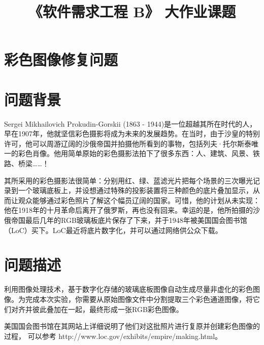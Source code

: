 \documentclass[withoutpreface,bwprint]{cumcmthesis} %
\title{《软件需求工程 B》 大作业课题}
\begin{document}

\newpage
 
%  

\newpage

\section*{\LARGE 彩色图像修复问题}


\section{问题背景}
Sergei Mikhailovich Prokudin-Gorskii (1863 - 1944)是一位超越其所在时代的人，早在1907年，他就坚信彩色摄影将成为未来的发展趋势。在当时，由于沙皇的特别许可，他可以周游辽阔的沙俄帝国并拍摄他所看到的事物，包括列夫·托尔斯泰唯一的彩色肖像。他用简单原始的彩色摄影法拍下了很多东西：人、建筑、风景、铁路、桥梁……！

其所采用的彩色摄影法很简单：分别用红、绿、蓝滤光片把每个场景的三次曝光记录到一个玻璃底板上，并设想通过特殊的投影装置将三种颜色的底片叠加显示，从而让观众能够通过彩色照片了解这个幅员辽阔的国家。可惜，他的计划从未实现：他在1918年的十月革命后离开了俄罗斯，再也没有回来。幸运的是，他所拍摄的沙俄帝国最后几年的RGB玻璃板底片保存了下来，并于1948年被美国国会图书馆（LoC）买下。LoC最近将底片数字化，并可以通过网络供公众下载。

\section{问题描述}
利用图像处理技术，基于数字化存储的玻璃底板图像自动生成尽量非虚化的彩色图像。为完成本次实验，你需要从原始图像文件中分割提取三个彩色通道图像，将它们对齐并彼此叠加在一起，最终形成一张RGB彩色图像。

美国国会图书馆在其网站上详细说明了他们对这批照片进行复原并创建彩色图像的过程，
可以参考 http://www.loc.gov/exhibits/empire/making.html。
\end{document}

